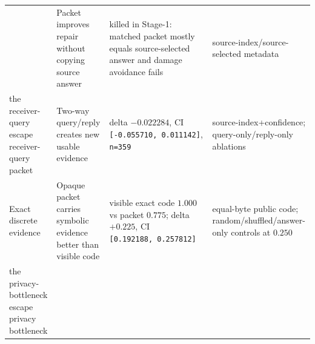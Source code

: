 \documentclass{article}
\begin{document}
\begin{longtable}[]{@{}llll@{}}
\begin{minipage}[t]{0.22\columnwidth}
\end{minipage} & \begin{minipage}[t]{0.22\columnwidth}\raggedright
Packet improves repair without copying source answer\strut
\end{minipage} & \begin{minipage}[t]{0.22\columnwidth}\raggedright
killed in Stage-1: matched packet mostly equals source-selected answer
and damage avoidance fails\strut
\end{minipage} & \begin{minipage}[t]{0.22\columnwidth}\raggedright
source-index/source-selected metadata\strut
\end{minipage}\tabularnewline
\begin{minipage}[t]{0.22\columnwidth}\raggedright
the receiver-query escape receiver-query packet\strut
\end{minipage} & \begin{minipage}[t]{0.22\columnwidth}\raggedright
Two-way query/reply creates new usable evidence\strut
\end{minipage} & \begin{minipage}[t]{0.22\columnwidth}\raggedright
delta \(-0.022284\), CI \texttt{{[}-0.055710,\ 0.011142{]}},
\texttt{n=359}\strut
\end{minipage} & \begin{minipage}[t]{0.22\columnwidth}\raggedright
source-index+confidence; query-only/reply-only ablations\strut
\end{minipage}\tabularnewline
\begin{minipage}[t]{0.22\columnwidth}\raggedright
Exact discrete evidence\strut
\end{minipage} & \begin{minipage}[t]{0.22\columnwidth}\raggedright
Opaque packet carries symbolic evidence better than visible code\strut
\end{minipage} & \begin{minipage}[t]{0.22\columnwidth}\raggedright
visible exact code \(1.000\) vs packet \(0.775\); delta
\(+0.225\), CI \texttt{{[}0.192188,\ 0.257812{]}}\strut
\end{minipage} & \begin{minipage}[t]{0.22\columnwidth}\raggedright
equal-byte public code; random/shuffled/answer-only controls at
\(0.250\)\strut
\end{minipage}\tabularnewline
\begin{minipage}[t]{0.22\columnwidth}\raggedright
the privacy-bottleneck escape privacy bottleneck\strut

\end{minipage}
\end{longtable}
\end{document}
